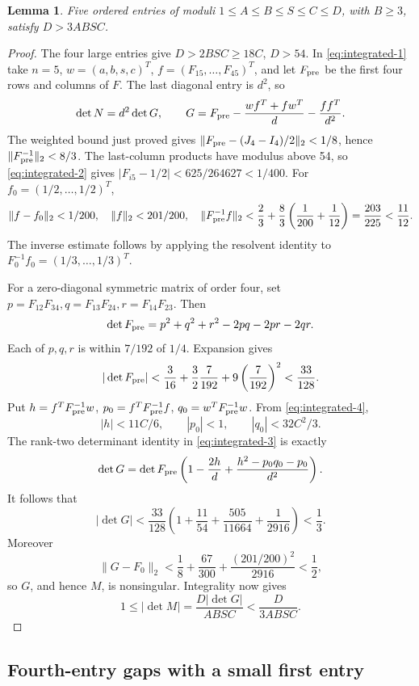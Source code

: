 \documentclass[12pt]{article}
\newtheorem{lemma}[theorem]{Lemma}
\numberwithin{equation}{section}
\begin{document}
\begin{lemma}\label{lem:product-five}
Five ordered entries of moduli \(1\le A\le B\le S\le C\le D\),
with \(B\ge3\), satisfy \(D>3ABSC\).
\end{lemma}
\begin{proof}
The four large entries give \(D>2BSC\ge18C\), \(D>54\).
In \eqref{eq:integrated-1} take \(n=5\), \(w=(a,b,s,c)^T\),
\(f=(F_{15},\ldots,F_{45})^T\), and let \(F_{\rm pre}\) be the first
four rows and columns of \(F\). The last diagonal entry is \(d^2\), so
\begin{equation}\label{eq:integrated-3}
\det N=d^2\det G,\qquad
 G=F_{\rm pre}-\frac{wf^T+fw^T}{d}-\frac{ff^T}{d^2}.
\end{equation}
The weighted bound just proved gives
\(\|F_{\rm pre}-(J_4-I_4)/2\|_2<1/8\), hence
\(\|F_{\rm pre}^{-1}\|_2<8/3\). The last-column products have
modulus above 54, so \eqref{eq:integrated-2} gives
\(|F_{i5}-1/2|<625/264627<1/400\).
For \(f_0=(1/2,\ldots,1/2)^T\),
\begin{equation}\label{eq:integrated-4}
\|f-f_0\|_2<1/200,\quad \|f\|_2<201/200,\quad
 \|F_{\rm pre}^{-1}f\|_2
 <\frac23+\frac83\left(\frac1{200}+\frac1{12}\right)
 =\frac{203}{225}<\frac{11}{12}.
\end{equation}
The inverse estimate follows by applying the resolvent identity to
\(F_0^{-1}f_0=(1/3,\ldots,1/3)^T\).

For a zero-diagonal symmetric matrix of order four, set
\(p=F_{12}F_{34},q=F_{13}F_{24},r=F_{14}F_{23}\). Then
\[
 \det F_{\rm pre}=p^2+q^2+r^2-2pq-2pr-2qr.
\]
Each of \(p,q,r\) is within \(7/192\) of \(1/4\). Expansion gives
\[
 |\det F_{\rm pre}|<
 \frac3{16}+\frac32\frac7{192}+9\left(\frac7{192}\right)^2
 <\frac{33}{128}.
\]
Put \(h=f^TF_{\rm pre}^{-1}w\), \(p_0=f^TF_{\rm pre}^{-1}f\),
\(q_0=w^TF_{\rm pre}^{-1}w\). From \eqref{eq:integrated-4},
\[
 |h|<11C/6,\qquad |p_0|<1,\qquad |q_0|<32C^2/3.
\]
The rank-two determinant identity in \eqref{eq:integrated-3} is exactly
\[
 \det G=\det F_{\rm pre}
 \left(1-\frac{2h}{d}+\frac{h^2-p_0q_0-p_0}{d^2}\right).
\]
It follows that
\[
 |\det G|<
 \frac{33}{128}\left(1+\frac{11}{54}+\frac{505}{11664}
                              +\frac1{2916}\right)<\frac13.
\]
Moreover
\[
 \|G-F_0\|_2<
 \frac18+\frac{67}{300}+\frac{(201/200)^2}{2916}<\frac12,
\]
so \(G\), and hence \(M\), is nonsingular. Integrality now gives
\[
 1\le|\det M|=\frac{D|\det G|}{ABSC}<\frac{D}{3ABSC}.
\]
\end{proof}

\subsection{Fourth-entry gaps with a small first entry}
\end{document}
